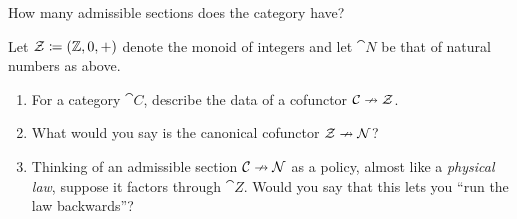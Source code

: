 \documentclass[Book-Poly]{subfiles}
\begin{document}
\begin{exercise}
How many admissible sections does the category \fbox{$\bullet\to\bullet$} have?
\end{exercise}

\begin{exercise}
Let $\mathcal{Z}\coloneqq(\mathbb{Z},0,+)$ denote the monoid of integers and let $\cat{N}$ be that of natural numbers as above.
\begin{enumerate}
	\item For a category $\cat{C}$, describe the data of a cofunctor $\mathcal{C}\nrightarrow\mathcal{Z}$.
	\item What would you say is the canonical cofunctor $\mathcal{Z}\nrightarrow\mathcal{N}$?
	\item Thinking of an admissible section $\mathcal{C}\nrightarrow\mathcal{N}$ as a policy, almost like a \emph{physical law}, suppose it factors through $\cat{Z}$. Would you say that this lets you ``run the law backwards''?
\qedhere
\end{enumerate}
\end{exercise}
\end{document}
